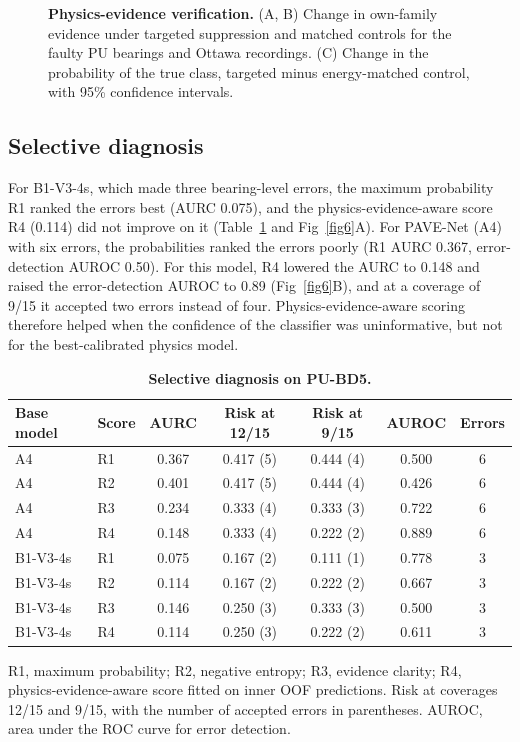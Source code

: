 \documentclass[10pt,letterpaper]{article}
\begin{document}
\begin{figure}[!h]
\caption{\textbf{Physics-evidence verification.} (A, B) Change in own-family evidence under targeted suppression and matched controls for the faulty PU bearings and Ottawa recordings. (C) Change in the probability of the true class, targeted minus energy-matched control, with 95\% confidence intervals.}
\label{fig5}
\end{figure}

\subsection*{Selective diagnosis}
For B1-V3-4s, which made three bearing-level errors, the maximum probability R1 ranked the errors best (AURC 0.075), and the physics-evidence-aware score R4 (0.114) did not improve on it (Table~\ref{tab:selective} and Fig~\ref{fig6}A). For PAVE-Net (A4) with six errors, the probabilities ranked the errors poorly (R1 AURC 0.367, error-detection AUROC 0.50). For this model, R4 lowered the AURC to 0.148 and raised the error-detection AUROC to 0.89 (Fig~\ref{fig6}B), and at a coverage of 9/15 it accepted two errors instead of four. Physics-evidence-aware scoring therefore helped when the confidence of the classifier was uninformative, but not for the best-calibrated physics model.

\begin{table}[!ht]
\centering
\caption{\textbf{Selective diagnosis on PU-BD5.}}
{\footnotesize
\setlength{\tabcolsep}{4pt}
\renewcommand{\arraystretch}{1.25}
\begin{tabular}{llccccc}
\hline
Base model & Score & AURC & Risk at 12/15 & Risk at 9/15 & AUROC & Errors \\
\hline
A4 & R1 & 0.367 & 0.417 (5) & 0.444 (4) & 0.500 & 6 \\
A4 & R2 & 0.401 & 0.417 (5) & 0.444 (4) & 0.426 & 6 \\
A4 & R3 & 0.234 & 0.333 (4) & 0.333 (3) & 0.722 & 6 \\
A4 & R4 & 0.148 & 0.333 (4) & 0.222 (2) & 0.889 & 6 \\
B1-V3-4s & R1 & 0.075 & 0.167 (2) & 0.111 (1) & 0.778 & 3 \\
B1-V3-4s & R2 & 0.114 & 0.167 (2) & 0.222 (2) & 0.667 & 3 \\
B1-V3-4s & R3 & 0.146 & 0.250 (3) & 0.333 (3) & 0.500 & 3 \\
B1-V3-4s & R4 & 0.114 & 0.250 (3) & 0.222 (2) & 0.611 & 3 \\
\hline
\end{tabular}}
\begin{flushleft} R1, maximum probability; R2, negative entropy; R3, evidence clarity; R4, physics-evidence-aware score fitted on inner OOF predictions. Risk at coverages 12/15 and 9/15, with the number of accepted errors in parentheses. AUROC, area under the ROC curve for error detection. \end{flushleft}
\label{tab:selective}
\end{table}
\end{document}

